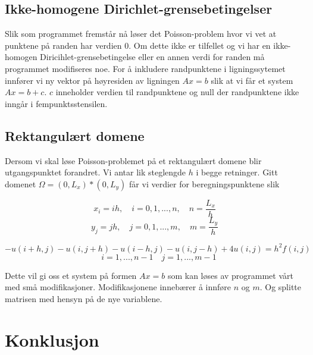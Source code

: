 \documentclass[11pt,norsk,a4paper]{article}
\begin{document}
\subsection{Ikke-homogene Dirichlet-grensebetingelser}
Slik som programmet fremstår nå løser det Poisson-problem hvor vi vet at punktene på randen har verdien 0. Om dette ikke er tilfellet og vi har en ikke-homogen Diricihlet-grensebetingelse eller en annen verdi for randen må programmet modifiseres noe. For å inkludere randpunktene i ligningssytemet innfører vi ny vektor på høyresiden av ligningen $Ax=b$ slik at vi får et system $Ax=b+c$. $c$ inneholder verdien til randpunktene og null der randpunktene ikke inngår i fempunktsstensilen. 

\subsection{Rektangulært domene}
Dersom vi skal løse Poisson-problemet på et rektangulært domene blir utgangspunktet forandret. Vi antar lik steglengde $h$ i begge retninger. Gitt domenet $\Omega = (0,L_x)*(0,L_y)$ får vi verdier for beregningspunktene slik

$$ x_i = ih, \quad i=0,1,...,n, \quad n = \frac{L_x}{h}  $$
$$ y_j = jh, \quad j=0,1,...,m, \quad m = \frac{L_y}{h} $$ 

$$
-u(i+h,j)-u(i,j+h)-u(i-h,j)-u(i,j-h)+4u(i,j) = h^2f(i,j) $$
$$\quad i=1,...,n-1 \quad j=1,...,m-1$$

Dette vil gi oss et system på formen $Ax=b$ som kan løses av programmet vårt med små modifikasjoner. Modifikasjonene innebærer å innføre $n$ og $m$. Og splitte matrisen med hensyn på de nye variablene.

\section{Konklusjon}
\end{document}
